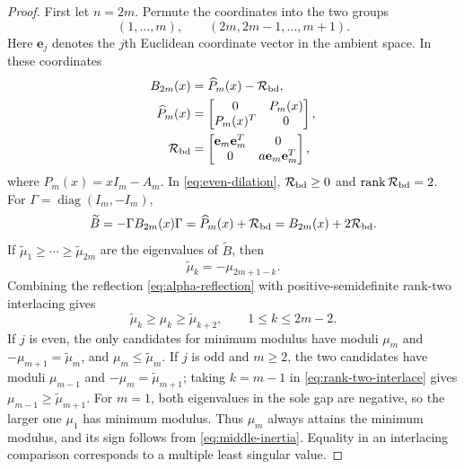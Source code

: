 \documentclass[10pt,twoside]{siamart1116}
\numberwithin{equation}{section}
\DeclareMathOperator{\diag}{diag}
\begin{document}
\begin{proof}
First let \(n=2m\).  Permute the coordinates into the two groups
\[
 (1,\ldots,m),\qquad(2m,2m-1,\ldots,m+1).
\]
Here \(\mathbf e_j\) denotes the \(j\)th Euclidean coordinate vector in
the ambient space.  In these coordinates
\begin{equation}\label{eq:even-dilation}
\begin{aligned}
 B_{2m}(x)&=\widehat P_m(x)-\mathcal R_{\rm bd},\\
 \widehat P_m(x)&=\begin{bmatrix}0&P_m(x)\\P_m(x)^T&0\end{bmatrix},\\
 \mathcal R_{\rm bd}
 &=\begin{bmatrix}\mathbf e_m\mathbf e_m^T&0\\
 0&a \mathbf e_m\mathbf e_m^T\end{bmatrix},
\end{aligned}
\end{equation}
where \(P_m(x)=xI_m-A_m\).  In \eqref{eq:even-dilation},
\(\mathcal R_{\rm bd}\geq0\) and
\(\operatorname{rank}\mathcal R_{\rm bd}=2\).  For
\(\Gamma=\diag(I_m,-I_m)\),
\[
 \widetilde B=-\Gamma B_{2m}(x)\Gamma
 =\widehat P_m(x)+\mathcal R_{\rm bd}
 =B_{2m}(x)+2\mathcal R_{\rm bd}.
\]
If \(\widetilde\mu_1\geq\cdots\geq\widetilde\mu_{2m}\) are the
eigenvalues of
\(\widetilde B\), then
\begin{equation}\label{eq:alpha-reflection}
 \widetilde\mu_k=-\mu_{2m+1-k}.
\end{equation}
Combining the reflection \eqref{eq:alpha-reflection} with
positive-semidefinite rank-two interlacing gives
\begin{equation}\label{eq:rank-two-interlace}
 \widetilde\mu_k\geq\mu_k\geq\widetilde\mu_{k+2},
 \qquad1\leq k\leq2m-2.
\end{equation}
If \(j\) is even, the only candidates for minimum modulus
have moduli \(\mu_m\) and
\(-\mu_{m+1}=\widetilde\mu_m\), and
\(\mu_m\leq\widetilde\mu_m\).  If \(j\) is odd and \(m\geq2\), the two
candidates have moduli \(\mu_{m-1}\) and
\(-\mu_m=\widetilde\mu_{m+1}\); taking \(k=m-1\) in
\eqref{eq:rank-two-interlace} gives
\(\mu_{m-1}\geq\widetilde\mu_{m+1}\).  For \(m=1\), both eigenvalues in
the sole gap are negative, so the larger one \(\mu_1\) has minimum
modulus.  Thus \(\mu_m\) always attains the minimum modulus, and its
sign follows from \eqref{eq:middle-inertia}.  Equality in an interlacing
comparison corresponds to a multiple least singular value.


\end{proof}
\end{document}
